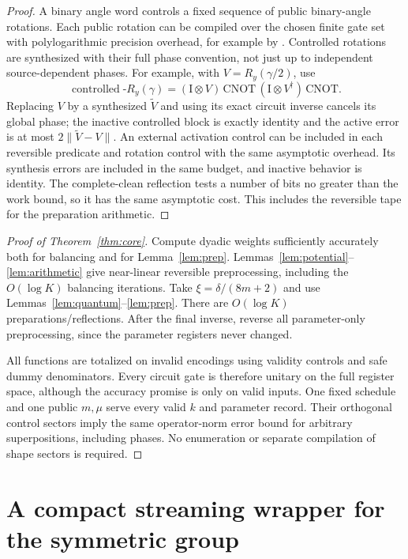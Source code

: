 \documentclass[11pt]{article}
\theoremstyle{definition}
\newcommand{\norm}[1]{\lVert #1\rVert}
\newcommand{\Id}{\mathrm I}
\begin{document}
\begin{proof}
A binary angle word controls a fixed sequence of public binary-angle
rotations. Each public rotation can be compiled over the chosen finite
gate set with polylogarithmic precision overhead, for example by
\cite{DN}. Controlled rotations are synthesized with their full phase
convention, not just up to independent source-dependent phases. For example,
with $V=R_y(\gamma/2)$, use
\[
 \operatorname{controlled}\!\text{-}R_y(\gamma)
 =(\Id\otimes V)\,\mathrm{CNOT}\,
  (\Id\otimes V^\dagger)\,\mathrm{CNOT}.
\]
Replacing $V$ by a synthesized $\widetilde V$ and using its exact circuit
inverse cancels its global phase; the inactive controlled block is exactly
identity and the active error is at most $2\norm{\widetilde V-V}$.
An external activation control can be included in each reversible predicate
and rotation control with the same asymptotic overhead. Its synthesis
errors are included in the same budget, and inactive behavior is identity.
The complete-clean reflection tests a number of bits no greater than
the work bound, so it has the same asymptotic cost. This includes the
reversible tape for the preparation arithmetic.
\end{proof}

\begin{proof}[Proof of Theorem~\ref{thm:core}]
Compute dyadic weights sufficiently accurately both for balancing and for
Lemma~\ref{lem:prep}. Lemmas~\ref{lem:potential}--\ref{lem:arithmetic}
give near-linear reversible preprocessing, including the $O(\log K)$
balancing iterations. Take $\xi=\delta/(8m+2)$ and use
Lemmas~\ref{lem:quantum}--\ref{lem:prep}. There are $O(\log K)$
preparations/reflections. After the final inverse, reverse all
parameter-only preprocessing, since the parameter registers never changed.

All functions are totalized on invalid encodings using validity controls
and safe dummy denominators. Every circuit gate is therefore unitary on
the full register space, although the accuracy promise is only on valid
inputs. One fixed schedule and one public $m,\mu$ serve every valid $k$
and parameter record. Their orthogonal control sectors imply the same
operator-norm error bound for arbitrary superpositions, including phases.
No enumeration or separate compilation of shape sectors is required.
\end{proof}

\section{A compact streaming wrapper for the symmetric group}
\end{document}
